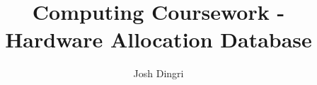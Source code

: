 \documentclass{report}
\begin{document}
\title{Computing Coursework - Hardware Allocation Database}
\author{Josh Dingri}
\maketitle
\tableofcontents






\end{document}
